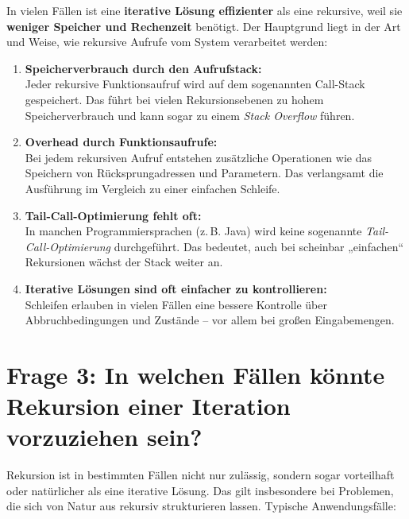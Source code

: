 \documentclass{article}
\begin{document}
	In vielen Fällen ist eine \textbf{iterative Lösung effizienter} als eine rekursive, weil sie \textbf{weniger Speicher und Rechenzeit} benötigt. Der Hauptgrund liegt in der Art und Weise, wie rekursive Aufrufe vom System verarbeitet werden:
\begin{enumerate}
	\item \textbf{Speicherverbrauch durch den Aufrufstack:} \\
	Jeder rekursive Funktionsaufruf wird auf dem sogenannten Call-Stack gespeichert. Das führt bei vielen Rekursionsebenen zu hohem Speicherverbrauch und kann sogar zu einem \emph{Stack Overflow} führen.
	
	\item \textbf{Overhead durch Funktionsaufrufe:} \\
	Bei jedem rekursiven Aufruf entstehen zusätzliche Operationen wie das Speichern von Rücksprungadressen und Parametern. Das verlangsamt die Ausführung im Vergleich zu einer einfachen Schleife.
	
	\item \textbf{Tail-Call-Optimierung fehlt oft:} \\
	In manchen Programmiersprachen (z.\,B. Java) wird keine sogenannte \emph{Tail-Call-Optimierung} durchgeführt. Das bedeutet, auch bei scheinbar „einfachen“ Rekursionen wächst der Stack weiter an.
	
	\item \textbf{Iterative Lösungen sind oft einfacher zu kontrollieren:} \\
	Schleifen erlauben in vielen Fällen eine bessere Kontrolle über Abbruchbedingungen und Zustände – vor allem bei großen Eingabemengen.
\end{enumerate}

	\section*{Frage 3: In welchen Fällen könnte Rekursion einer Iteration vorzuziehen sein?}

Rekursion ist in bestimmten Fällen nicht nur zulässig, sondern sogar vorteilhaft oder natürlicher als eine iterative Lösung. Das gilt insbesondere bei Problemen, die sich von Natur aus rekursiv strukturieren lassen. Typische Anwendungsfälle:
\end{document}
